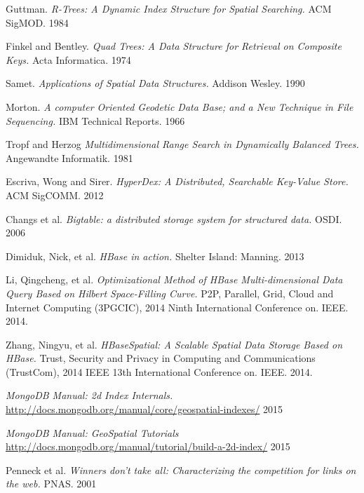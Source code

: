 \documentclass[11pt]{article}
\begin{document}
\raggedright

\begin{thebibliography}{99}

  Guttman.
  \emph{R-Trees: A Dynamic Index Structure for Spatial Searching.}
  ACM SigMOD.
  1984

  Finkel and Bentley.
  \emph{Quad Trees: A Data Structure for Retrieval on Composite Keys.}
  Acta Informatica.
  1974

  Samet.
  \emph{Applications of Spatial Data Structures.}
  Addison Wesley.
  1990

  Morton.
  \emph{A computer Oriented Geodetic Data Base; and a New Technique in File Sequencing.}
  IBM Technical Reports. 
  1966

 Tropf and Herzog
 \emph{Multidimensional Range Search in Dynamically Balanced Trees.}
 Angewandte Informatik.
 1981

  Escriva, Wong and Sirer.
  \emph{HyperDex: A Distributed, Searchable Key-Value Store.}
  ACM SigCOMM.
  2012

  Changs et al.
  \emph{Bigtable: a distributed storage system for structured data.}
  OSDI.
  2006

  Dimiduk, Nick, et al.
  \emph{HBase in action.}
   Shelter Island: Manning.
   2013

  Li, Qingcheng, et al.
  \emph{Optimizational Method of HBase Multi-dimensional Data Query Based on Hilbert Space-Filling Curve.}
   P2P, Parallel, Grid, Cloud and Internet Computing (3PGCIC), 2014 Ninth International Conference on. IEEE.
   2014.

  Zhang, Ningyu, et al. 
  \emph{HBaseSpatial: A Scalable Spatial Data Storage Based on HBase.}
   Trust, Security and Privacy in Computing and Communications (TrustCom), 2014 IEEE 13th International Conference on. IEEE.
   2014. 
   
  \emph{MongoDB Manual: 2d Index Internals.}
  \url{http://docs.mongodb.org/manual/core/geospatial-indexes/}
  2015


  \emph{MongoDB Manual: GeoSpatial Tutorials}
  \url{http://docs.mongodb.org/manual/tutorial/build-a-2d-index/}
  2015

  Penneck et al.
  \emph{Winners don't take all: Characterizing the competition for links on the web.}
  PNAS.
  2001


\end{thebibliography}
\end{document}
